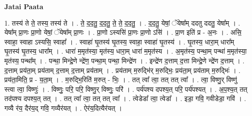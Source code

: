 \documentclass[17pt]{extarticle}
\begin{document}
\textbf{Jatai Paata} \newline

1. तस्य॑ ते ते॒ तस्य॒ तस्य॑ ते । . ते॒ द॒द॒तु॒ द॒द॒तु॒ ते॒ ते॒ द॒द॒तु॒ । . द॒द॒तु॒ येषां॒ ॅयेषा᳚म् ददतु ददतु॒ येषा᳚म् । . येषा᳚म् प्रा॒णः प्रा॒णो येषां॒ ॅयेषा᳚म् प्रा॒णः । . प्रा॒णो ऽस्यसि॑ प्रा॒णः प्रा॒णो ऽसि॑ । . प्रा॒ण इति॑ प्र - अ॒नः । . असि॒ स्वाहा॒ स्वाहा ऽस्यसि॒ स्वाहा᳚ । . स्वाहा॑ घृ॒तस्य॑ घृ॒तस्य॒ स्वाहा॒ स्वाहा॑ घृ॒तस्य॑ । . घृ॒तस्य॒ धारा॒म् धारा᳚म् घृ॒तस्य॑ घृ॒तस्य॒ धारा᳚म् । . धारा॑ म॒मृत॑स्या॒ मृत॑स्य॒ धारा॒म् धारा॑ म॒मृत॑स्य । . अ॒मृत॑स्य॒ पन्था॒म् पन्था॑ म॒मृत॑स्या॒ मृत॑स्य॒ पन्था᳚म् । . पन्था॒ मिन्द्रे॒णे न्द्रे॑ण॒ पन्था॒म् पन्था॒ मिन्द्रे॑ण । . इन्द्रे॑ण द॒त्ताम् द॒त्ता मिन्द्रे॒णे न्द्रे॑ण द॒त्ताम् । . द॒त्ताम् प्रय॑ता॒म् प्रय॑ताम् द॒त्ताम् द॒त्ताम् प्रय॑ताम् । . प्रय॑ताम् म॒रुद्भि॑र् म॒रुद्भिः॒ प्रय॑ता॒म् प्रय॑ताम् म॒रुद्भिः॑ । . प्रय॑ता॒मिति॒ प्र - य॒ता॒म् । . म॒रुद्भि॒रिति॑ म॒रुत् - भिः॒ । . तत् त्वा᳚ त्वा॒ तत् तत् त्वा᳚ । . त्वा॒ विष्णु॒र् विष्णु॑ स्त्वा त्वा॒ विष्णुः॑ । . विष्णुः॒ परि॒ परि॒ विष्णु॒र् विष्णुः॒ परि॑ । . पर्य॑पश्य दपश्य॒त् परि॒ पर्य॑पश्यत् । . अ॒प॒श्य॒त् तत् तद॑पश्य दपश्य॒त् तत् । . तत् त्वा᳚ त्वा॒ तत् तत् त्वा᳚ । . त्वेडेडा᳚ त्वा॒ त्वेडा᳚ । . इडा॒ गवि॒ गवीडेडा॒ गवि॑ । . गव्यै र॑य॒ दैर॑य॒द् गवि॒ गव्यैर॑यत् । . ऐर॑य॒दित्यैर॑यत् । \newline
\end{document}
